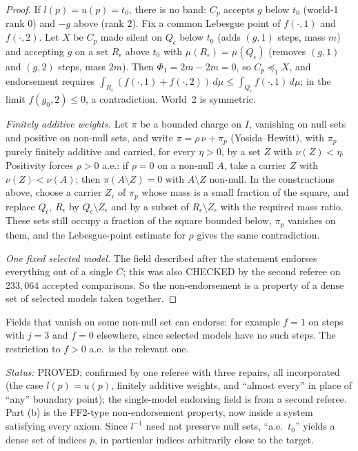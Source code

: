 \documentclass[11pt]{article}
\theoremstyle{definition}\newtheorem{definition}[theorem]{Definition}
\theoremstyle{remark}\newtheorem{remark}[theorem]{Remark}
\newcommand{\status}[1]{\par\noindent\emph{Status:} #1\par}
\begin{document}
\begin{proof}
If $l(p)=u(p)=t_0$, there is no band: $C_p$ accepts $g$ below $t_0$ (world-1
rank $0$) and $-g$ above (rank $2$). Fix a common Lebesgue point of
$f(\cdot,1)$ and $f(\cdot,2)$. Let $X$ be $C_p$ made silent on $Q_\epsilon$
below $t_0$ (adds $(g,1)$ steps, mass $m$) and accepting $g$ on a set
$R_\epsilon$ above $t_0$ with $\mu(R_\epsilon)=\mu(Q_\epsilon)$ (removes $(g,1)$
and $(g,2)$ steps, mass $2m$). Then $\Phi_1=2m-2m=0$, so $C_p\preceq_1X$, and
endorsement requires $\int_{R_\epsilon}(f(\cdot,1)+f(\cdot,2))\,d\mu\le
\int_{Q_\epsilon}f(\cdot,1)\,d\mu$; in the limit $f(g_0,2)\le0$, a
contradiction. World~2 is symmetric.

\emph{Finitely additive weights.} Let $\pi$ be a bounded charge on $I$,
vanishing on null sets and positive on non-null sets, and write
$\pi=\rho\,\nu+\pi_p$ (Yosida--Hewitt), with $\pi_p$ purely finitely additive
and carried, for every $\eta>0$, by a set $Z$ with $\nu(Z)<\eta$. Positivity
forces $\rho>0$ a.e.: if $\rho=0$ on a non-null $A$, take a carrier $Z$ with
$\nu(Z)<\nu(A)$; then $\pi(A\setminus Z)=0$ with $A\setminus Z$ non-null. In
the constructions above, choose a carrier $Z_\epsilon$ of $\pi_p$ whose mass is
a small fraction of the square, and replace $Q_\epsilon$, $R_\epsilon$ by
$Q_\epsilon\setminus Z_\epsilon$ and by a subset of $R_\epsilon\setminus
Z_\epsilon$ with the required mass ratio. These sets still occupy a fraction of
the square bounded below, $\pi_p$ vanishes on them, and the Lebesgue-point
estimate for $\rho$ gives the same contradiction.

\emph{One fixed selected model.} The field described after the statement
endorses everything out of a single $C$; this was also CHECKED by the second
referee on $233{,}064$ accepted comparisons. So the non-endorsement is a
property of a dense set of selected models taken together.
\end{proof}

\noindent Fields that vanish on some non-null set can endorse: for example
$f=1$ on steps with $j=3$ and $f=0$ elsewhere, since selected models have no
such steps. The restriction to $f>0$ a.e.\ is the relevant one.

\status{PROVED; confirmed by one referee with three repairs, all
incorporated (the case $l(p)=u(p)$, finitely additive weights, and ``almost
every'' in place of ``any'' boundary point); the single-model endorsing field is
from a second referee. Part (b) is the FF2-type
non-endorsement property, now inside a system satisfying every axiom. Since
$l^{-1}$ need not preserve null sets, ``a.e.\ $t_0$'' yields a dense set of
indices $p$, in particular indices arbitrarily close to the target.}
\end{document}
